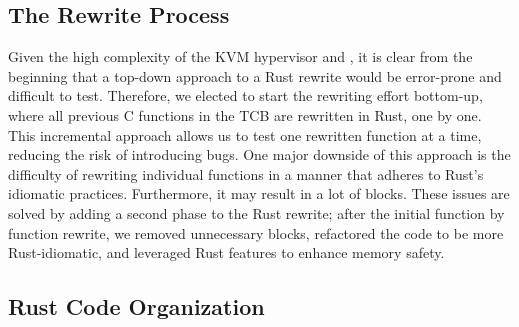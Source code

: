 \subsection{The Rewrite Process}
Given the high complexity of the KVM hypervisor and \secore{},
it is clear from the beginning that
a top-down approach to a Rust rewrite would be error-prone and difficult to test.
Therefore, we elected to start the rewriting effort bottom-up,
where all previous C functions in the TCB are rewritten in Rust, one by one.
This incremental approach allows us to test one rewritten function at a time,
reducing the risk of introducing bugs.
One major downside of this approach is the difficulty of rewriting individual
functions in a manner that adheres to Rust's idiomatic practices.
Furthermore, it may result in a lot of  blocks.
These issues are solved by adding a second phase to the Rust rewrite;
after the initial function by function rewrite, we removed unnecessary
 blocks, refactored the code to be more Rust-idiomatic,
and leveraged Rust features to enhance \rustcore{} memory safety.

\subsection{Rust Code Organization}
\label{sec:RCO}

